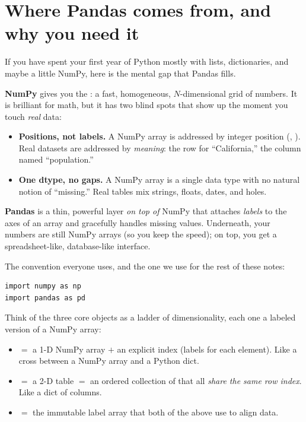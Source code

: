 \documentclass[11pt]{article}
\begin{document}

\section{Where Pandas comes from, and why you need it}

\begin{background}
If you have spent your first year of Python mostly with lists, dictionaries, and maybe a little NumPy, here is the mental gap that Pandas fills.

\textbf{NumPy} gives you the : a fast, homogeneous, $N$-dimensional grid of numbers. It is brilliant for math, but it has two blind spots that show up the moment you touch \emph{real} data:
\begin{itemize}
  \item \textbf{Positions, not labels.} A NumPy array is addressed by integer position (, ). Real datasets are addressed by \emph{meaning}: the row for ``California,'' the column named ``population.''
  \item \textbf{One dtype, no gaps.} A NumPy array is a single data type with no natural notion of ``missing.'' Real tables mix strings, floats, dates, and holes.
\end{itemize}
\textbf{Pandas} is a thin, powerful layer \emph{on top of} NumPy that attaches \emph{labels} to the axes of an array and gracefully handles missing values. Underneath, your numbers are still NumPy arrays (so you keep the speed); on top, you get a spreadsheet-like, database-like interface.
\end{background}

The convention everyone uses, and the one we use for the rest of these notes:

\begin{lstlisting}
import numpy as np
import pandas as pd
\end{lstlisting}

\begin{intuition}
Think of the three core objects as a ladder of dimensionality, each one a labeled version of a NumPy array:
\begin{itemize}
  \item \textbf{} $=$ a 1-D NumPy array $+$ an explicit index (labels for each element). Like a cross between a NumPy array and a Python dict.
  \item \textbf{} $=$ a 2-D table $=$ an ordered collection of  that all \emph{share the same row index}. Like a dict of columns.
  \item \textbf{} $=$ the immutable label array that both of the above use to align data.
\end{itemize}
\end{intuition}
\end{document}
